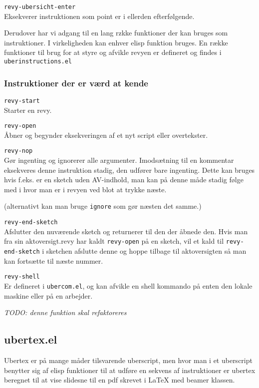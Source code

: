 \documentclass[10pt,a4paper,danish]{article}
\newcommand{\code}[1]{\colorbox{verbgray}{\texttt{#1}}}
\begin{document}
\code{revy-ubersicht-enter}\\
Eksekverer instruktionen som point er i ellerden efterfølgende.

Derudover har vi adgang til en lang rzkke funktioner der kan bruges som
instruktioner. I virkeligheden kan enhver elisp funktion bruges. En række
funktioner til brug for at styre og afvikle revyen er defineret og findes i
\code{uberinstructions.el}

\subsubsection{Instruktioner der er værd at kende}

\code{revy-start}\\
Starter en revy.

\code{revy-open}\\
Åbner og begynder eksekveringen af et nyt script eller overtekster.

\code{revy-nop}\\
Gør ingenting og ignorerer alle argumenter. Imodsætning til en kommentar
eksekveres denne instruktion stadig, den udfører bare ingenting. Dette kan
bruges hvis f.eks. er en sketch uden AV-indhold, man kan på denne måde stadig
følge med i hvor man er i revyen ved blot at trykke næste.

(alternativt kan man bruge \code{ignore} som gør næsten det samme.)

\code{revy-end-sketch}\\
Afslutter den nuværende sketch og returnerer til den der åbnede den. Hvis man
fra sin aktoversigt.revy har kaldt \code{revy-open} på en sketch, vil et kald
til \code{revy-end-sketch} i sketchen afslutte denne og hoppe tilbage til
aktoversigten så man kan fortsætte til næste nummer.

\code{revy-shell}\\
Er defineret i \code{ubercom.el}, og kan afvikle en shell kommando på enten den
lokale maskine eller på en arbejder.

\textit{TODO: denne funktion skal refaktoreres}

\subsection{ubertex.el}
Ubertex er på mange måder tilsvarende uberscript, men hvor man i et uberscript
benytter sig af elisp funktioner til at udføre en sekvens af instruktioner er
ubertex beregnet til at vise slidesne til en pdf skrevet i \LaTeX{} med beamer
klassen.
\end{document}
